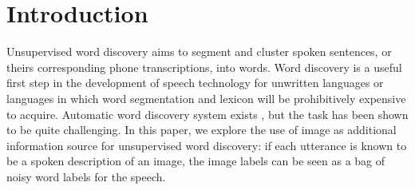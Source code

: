 \documentclass[journal]{IEEEtran}
\begin{document}
\section{Introduction}
Unsupervised word discovery aims to segment and cluster spoken sentences, or theirs corresponding phone transcriptions, into words. Word discovery is a useful first step in the development of speech technology for unwritten languages or languages in which word segmentation and lexicon will be prohibitively expensive to acquire. Automatic word discovery system exists \cite{Bharadwaj2013, Rasanen2015, Kamper2017}, but the task has been shown to be quite challenging. In this paper, we explore the use of image as additional information source for unsupervised word discovery: if each utterance is known to be a spoken description of an image, the image labels can be seen as a bag of noisy word labels for the speech.  


% 
% 
% 
% 



 
\end{document}
